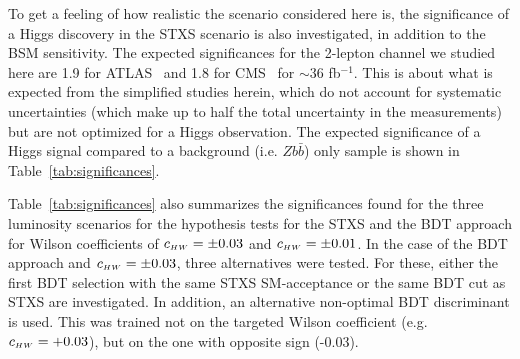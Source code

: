 To get a feeling of how realistic the scenario considered here is, the significance of a Higgs discovery in the STXS scenario is also investigated, in addition to the BSM sensitivity. The expected significances for the 2-lepton channel we studied here are 1.9 for ATLAS~\cite{Aaboud:2017xsd} and 1.8 for CMS~\cite{Sirunyan:2017elk} for $\sim$36 fb$^{-1}$. This is about what is expected from the simplified studies herein, which do not account for systematic uncertainties (which make up to half the total uncertainty in the measurements) but are not optimized for a Higgs observation. The expected significance of a Higgs signal compared to a background (i.e. $Z b\bar{b}$) only sample is shown in Table~\ref{tab:significances}.

Table~\ref{tab:significances} also summarizes the significances found for the three luminosity scenarios for the hypothesis tests for the STXS and the BDT approach for Wilson coefficients of $c_{\scriptscriptstyle HW} = \pm0.03$ and $c_{\scriptscriptstyle HW} = \pm0.01$. In the case of the BDT approach and $c_{\scriptscriptstyle HW} = \pm0.03$, three alternatives were tested. For these, either the first BDT selection with the same STXS SM-acceptance or the same BDT cut as STXS are investigated. In addition, an alternative non-optimal BDT discriminant is used. This was trained not on the targeted Wilson coefficient (e.g. $c_{\scriptscriptstyle HW}=+0.03$), but on the one with opposite sign (-0.03). 

